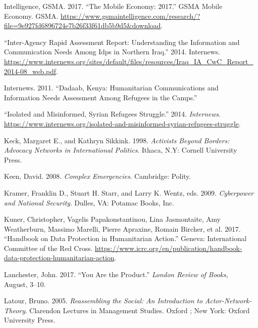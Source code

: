\documentclass[
]{article}
\newlength{\cslhangindent}
\newenvironment{cslreferences}%
  {\setlength{\parindent}{0pt}%
  \everypar{\setlength{\hangindent}{\cslhangindent}}\ignorespaces}%
  {\par}
\begin{document}
\begin{cslreferences}
\leavevmode\hypertarget{ref-GSMAIntelligence2017Mobile}{}%
Intelligence, GSMA. 2017. ``The Mobile Economy: 2017.'' GSMA Mobile
Economy. GSMA.
\url{https://www.gsmaintelligence.com/research/?file=9e927fd6896724e7b26f33f61db5b9d5\&download}.

\leavevmode\hypertarget{ref-2014Inter-Agency}{}%
``Inter-Agency Rapid Assessment Report: Understanding the Information
and Communication Needs Among Idps in Northern Iraq.'' 2014. Internews.
\url{https://www.internews.org/sites/default/files/resources/Iraq_IA_CwC_Report_2014-08_web.pdf}.

\leavevmode\hypertarget{ref-Internews2011Dadaab}{}%
Internews. 2011. ``Dadaab, Kenya: Humanitarian Communications and
Information Needs Assessment Among Refugees in the Camps.''

\leavevmode\hypertarget{ref-2014Isolated}{}%
``Isolated and Misinformed, Syrian Refugees Struggle.'' 2014.
\emph{Internews}.
\url{https://www.internews.org/isolated-and-misinformed-syrian-refugees-struggle}.

\leavevmode\hypertarget{ref-Keck1998Activists}{}%
Keck, Margaret E., and Kathryn Sikkink. 1998. \emph{Activists Beyond
Borders: Advocacy Networks in International Politics}. Ithaca, N.Y:
Cornell University Press.

\leavevmode\hypertarget{ref-Keen2008Complex}{}%
Keen, David. 2008. \emph{Complex Emergencies}. Cambridge: Polity.

\leavevmode\hypertarget{ref-2009Cyberpower}{}%
Kramer, Franklin D., Stuart H. Starr, and Larry K. Wentz, eds. 2009.
\emph{Cyberpower and National Security}. Dulles, VA: Potamac Books, Inc.

\leavevmode\hypertarget{ref-Kuner2017Handbook}{}%
Kuner, Christopher, Vagelis Papakonstantinou, Lina Jasmontaite, Amy
Weatherburn, Massimo Marelli, Pierre Apraxine, Romain Bircher, et al.
2017. ``Handbook on Data Protection in Humanitarian Action.'' Geneva:
International Committee of the Red Cross.
\url{https://www.icrc.org/en/publication/handbook-data-protection-humanitarian-action}.

\leavevmode\hypertarget{ref-Lanchester2017You}{}%
Lanchester, John. 2017. ``You Are the Product.'' \emph{London Review of
Books}, August, 3--10.

\leavevmode\hypertarget{ref-Latour2005Reassembling}{}%
Latour, Bruno. 2005. \emph{Reassembling the Social: An Introduction to
Actor-Network-Theory}. Clarendon Lectures in Management Studies. Oxford
; New York: Oxford University Press.


\end{cslreferences}
\end{document}
